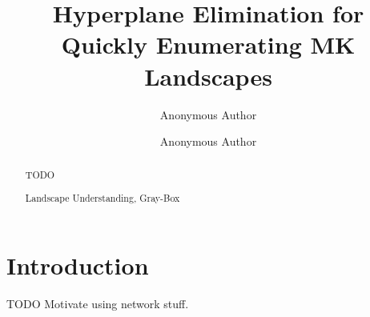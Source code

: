 \documentclass[runningheads,a4paper]{llncs}
\newcommand{\keywords}[1]{\par\addvspace\baselineskip
\noindent\keywordname\enspace\ignorespaces#1}
\begin{document}
\mainmatter  %

\title{Hyperplane Elimination for Quickly Enumerating MK Landscapes}


%
%
\author{Anonymous Author\and Anonymous Author}

%


%
%

\maketitle


\begin{abstract}
TODO

\keywords{Landscape Understanding, Gray-Box}
\end{abstract}


\section{Introduction}
TODO Motivate using network stuff.
\end{document}
